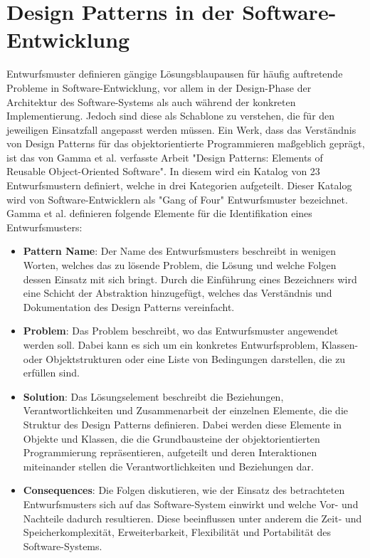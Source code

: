 \section{Design Patterns in der Software-Entwicklung}

Entwurfsmuster definieren gängige Lösungsblaupausen für häufig auftretende Probleme in Software-Entwicklung, vor allem in der Design-Phase der Architektur des Software-Systems
als auch während der konkreten Implementierung. Jedoch sind diese als Schablone zu verstehen, die für den jeweiligen Einsatzfall angepasst werden müssen.
Ein Werk, dass das Verständnis von Design Patterns für das objektorientierte Programmieren maßgeblich geprägt, ist das von Gamma et al. verfasste Arbeit "Design Patterns: Elements of Reusable Object-Oriented Software".
In diesem wird ein Katalog von 23 Entwurfsmustern definiert, welche in drei Kategorien aufgeteilt. Dieser Katalog wird von Software-Entwicklern als "Gang of Four" Entwurfsmuster bezeichnet. Gamma et al. definieren folgende Elemente für die Identifikation eines Entwurfsmusters:\cite[S. 3]{gamma1994design}

\begin{itemize}
    \item \textbf{Pattern Name}: Der Name des Entwurfsmusters beschreibt in wenigen Worten, welches das zu lösende Problem, die Lösung und welche Folgen dessen Einsatz mit sich bringt. Durch die Einführung eines Bezeichners wird eine Schicht der Abstraktion hinzugefügt, welches das Verständnis und Dokumentation des Design Patterns vereinfacht.
    \item \textbf{Problem}: Das Problem beschreibt, wo das Entwurfsmuster angewendet werden soll. Dabei kann es sich um ein konkretes Entwurfsproblem, Klassen- oder Objektstrukturen oder eine Liste von Bedingungen darstellen, die zu erfüllen sind.
    \item \textbf{Solution}: Das Lösungselement beschreibt die Beziehungen, Verantwortlichkeiten und Zusammenarbeit der einzelnen Elemente, die die Struktur des Design Patterns definieren. Dabei werden diese Elemente in Objekte und Klassen, die die Grundbausteine der objektorientierten Programmierung repräsentieren, aufgeteilt und deren Interaktionen miteinander stellen die Verantwortlichkeiten und Beziehungen dar.
    \item \textbf{Consequences}: Die Folgen diskutieren, wie der Einsatz des betrachteten Entwurfsmusters sich auf das Software-System einwirkt und welche Vor- und Nachteile dadurch resultieren. Diese beeinflussen unter anderem die Zeit- und Speicherkomplexität, Erweiterbarkeit, Flexibilität und Portabilität des Software-Systems.
\end{itemize}

